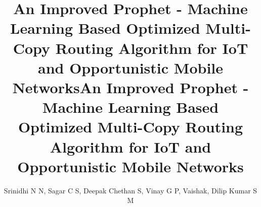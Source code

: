 \documentclass[10pt,journal]{IEEEtran}
\begin{document}
\title{An Improved Prophet - Machine Learning Based Optimized Multi-Copy Routing Algorithm for IoT and Opportunistic Mobile Networks}


%
\title{An Improved Prophet - Machine Learning Based Optimized Multi-Copy Routing Algorithm for IoT and Opportunistic Mobile Networks}
\author[$\dag$ ]{Srinidhi N N, Sagar C S, Deepak Chethan S, Vinay G P, Vaishak, Dilip Kumar S M} 

\end{document}
